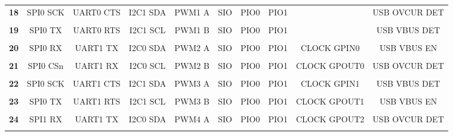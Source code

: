 \documentclass[a4paper,12pt,twoside]{article}
\begin{document}
\begin{center}
{\begin{tabular}{|c|*{9}{c|}}
			\textbf{18}   & SPI0 SCK    & UART0 CTS   & I2C1 SDA    & PWM1 A      & SIO         & PIO0        & PIO1        &              & USB OVCUR DET \\
			              &             &             &             &             &             &             &             &              &               \\ \hline
			\textbf{19}   & SPI0 TX     & UART0 RTS   & I2C1 SCL    & PWM1 B      & SIO         & PIO0        & PIO1        &              & USB VBUS DET  \\
			              &             &             &             &             &             &             &             &              &               \\ \hline
			\textbf{20}   & SPI0 RX     & UART1 TX    & I2C0 SDA    & PWM2 A      & SIO         & PIO0        & PIO1        & CLOCK GPIN0  & USB VBUS EN   \\
			              &             &             &             &             &             &             &             &              &               \\ \hline
			\textbf{21}   & SPI0 CSn    & UART1 RX    & I2C0 SCL    & PWM2 B      & SIO         & PIO0        & PIO1        & CLOCK GPOUT0 & USB OVCUR DET \\
			              &             &             &             &             &             &             &             &              &               \\ \hline
			\textbf{22}   & SPI0 SCK    & UART1 CTS   & I2C1 SDA    & PWM3 A      & SIO         & PIO0        & PIO1        & CLOCK GPIN1  & USB VBUS DET  \\
			              &             &             &             &             &             &             &             &              &               \\ \hline
			\textbf{23}   & SPI0 TX     & UART1 RTS   & I2C1 SCL    & PWM3 B      & SIO         & PIO0        & PIO1        & CLOCK GPOUT1 & USB VBUS EN   \\
			              &             &             &             &             &             &             &             &              &               \\ \hline
			\textbf{24}   & SPI1 RX     & UART1 TX    & I2C0 SDA    & PWM4 A      & SIO         & PIO0        & PIO1        & CLOCK GPOUT2 & USB OVCUR DET \\
			              &             &             &             &             &             &             &             &              &               \\ \hline

\end{tabular}}
\end{center}
\end{document}

